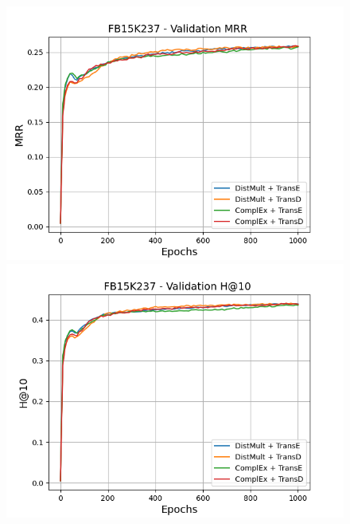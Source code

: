 \begin{figure}[H]
    \centering
    \begin{minipage}{.45\textwidth}
      \centering
      \includegraphics[width=0.9\linewidth]{figures/results/gan_train/not_pretrained/random/fb15k237/epochs1000/random_fb15k237_mrrs.png}
    \end{minipage}%
    \begin{minipage}{.45\textwidth}
      \centering
      \includegraphics[width=0.9\linewidth]{figures/results/gan_train/not_pretrained/random/fb15k237/epochs1000/random_fb15k237_hit10.png}
    \end{minipage}
    

\end{figure}
